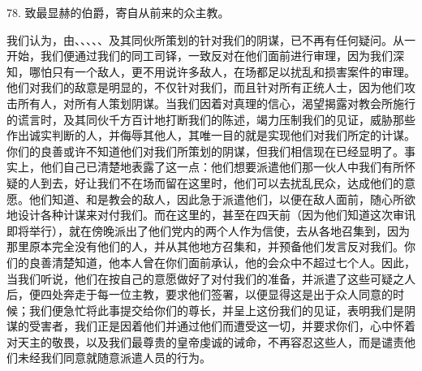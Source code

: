 78. 致最显赫的伯爵，寄自从前来的众主教。\par

我们认为，由、、、、、及其同伙所策划的针对我们的阴谋，已不再有任何疑问。从一开始，我们便通过我们的同工司铎，一致反对在他们面前进行审理，因为我们深知，哪怕只有一个敌人，更不用说许多敌人，在场都足以扰乱和损害案件的审理。他们对我们的敌意是明显的，不仅针对我们，而且针对所有正统人士，因为他们攻击所有人，对所有人策划阴谋。当我们因着对真理的信心，渴望揭露对教会所施行的谎言时，及其同伙千方百计地打断我们的陈述，竭力压制我们的见证，威胁那些作出诚实判断的人，并侮辱其他人，其唯一目的就是实现他们对我们所定的计谋。你们的良善或许不知道他们对我们所策划的阴谋，但我们相信现在已经显明了。事实上，他们自己已清楚地表露了这一点：他们想要派遣他们那一伙人中我们有所怀疑的人到去，好让我们不在场而留在这里时，他们可以去扰乱民众，达成他们的意愿。他们知道、和是教会的敌人，因此急于派遣他们，以便在敌人面前，随心所欲地设计各种计谋来对付我们。而在这里的，甚至在四天前（因为他们知道这次审讯即将举行），就在傍晚派出了他们党内的两个人作为信使，去从各地召集到，因为那里原本完全没有他们的人，并从其他地方召集和，并预备他们发言反对我们。你们的良善清楚知道，他本人曾在你们面前承认，他的会众中不超过七个人。因此，当我们听说，他们在按自己的意愿做好了对付我们的准备，并派遣了这些可疑之人后，便四处奔走于每一位主教，要求他们签署，以便显得这是出于众人同意的时候；我们便急忙将此事提交给你们的尊长，并呈上这份我们的见证，表明我们是阴谋的受害者，我们正是因着他们并通过他们而遭受这一切，并要求你们，心中怀着对天主的敬畏，以及我们最尊贵的皇帝虔诚的诫命，不再容忍这些人，而是谴责他们未经我们同意就随意派遣人员的行为。\par

\par

